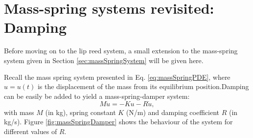 \section{Mass-spring systems revisited: Damping}\label{sec:massSpringDamping}
Before moving on to the lip reed system, a small extension to the mass-spring system given in Section \ref{sec:massSpringSystem} will be given here. 

Recall the mass spring system presented in Eq. \eqref{eq:massSpringPDE}, where $u=u(t)$ is the displacement of the mass from its equilibrium position.Damping can be easily be added to yield a mass-spring-damper system: 
\begin{equation}\label{eq:massSpringDampingPDE}
    M\ddot u = -Ku - R\dot u,
\end{equation}
with mass $M$ (in kg), spring constant $K$ (N/m) and damping coefficient $R$ (in kg/s). Figure \ref{fig:massSpringDamper} shows the behaviour of the system for different values of $R$. 

